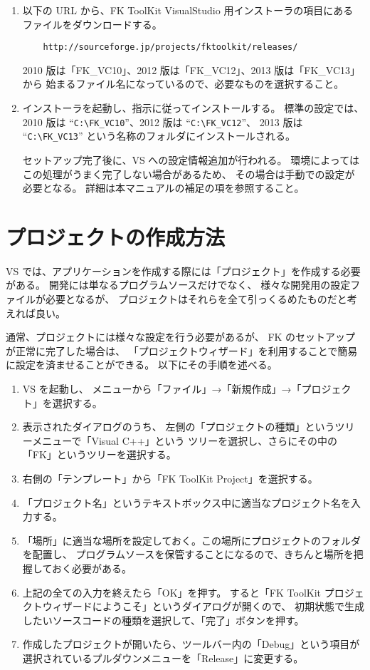 \documentclass[a4j]{jarticle}
\begin{document}
\begin{enumerate}
\item 以下の URL から、FK ToolKit VisualStudio 用インストーラの項目にある
ファイルをダウンロードする。

\begin{verbatim}
    http://sourceforge.jp/projects/fktoolkit/releases/
\end{verbatim}

2010 版は「FK\_VC10」、2012 版は「FK\_VC12」、2013 版は「FK\_VC13」から
始まるファイル名になっているので、必要なものを選択すること。

\item インストーラを起動し、指示に従ってインストールする。
標準の設定では、2010 版は ``\verb+C:\FK_VC10+''、2012 版は ``\verb+C:\FK_VC12+''、
2013 版は ``\verb+C:\FK_VC13+'' という名称のフォルダにインストールされる。

セットアップ完了後に、VS への設定情報追加が行われる。
環境によってはこの処理がうまく完了しない場合があるため、
その場合は手動での設定が必要となる。
詳細は本マニュアルの補足の項を参照すること。


\end{enumerate}

\section{プロジェクトの作成方法}
VS では、アプリケーションを作成する際には「プロジェクト」を作成する必要がある。
開発には単なるプログラムソースだけでなく、
様々な開発用の設定ファイルが必要となるが、
プロジェクトはそれらを全て引っくるめたものだと考えれば良い。

通常、プロジェクトには様々な設定を行う必要があるが、
FK のセットアップが正常に完了した場合は、
「プロジェクトウィザード」を利用することで簡易に設定を済ませることができる。
以下にその手順を述べる。

\begin{enumerate}
 \item VS を起動し、
	メニューから「ファイル」→「新規作成」→「プロジェクト」を選択する。
 \item 表示されたダイアログのうち、
	左側の「プロジェクトの種類」というツリーメニューで「Visual C++」という
	ツリーを選択し、さらにその中の「FK」というツリーを選択する。
 \item 右側の「テンプレート」から「FK ToolKit Project」を選択する。
 \item 「プロジェクト名」というテキストボックス中に適当なプロジェクト名を入力する。
 \item 「場所」に適当な場所を設定しておく。この場所にプロジェクトのフォルダを配置し、
	プログラムソースを保管することになるので、きちんと場所を把握しておく必要がある。
 \item 上記の全ての入力を終えたら「OK」を押す。
	すると「FK ToolKit プロジェクトウィザードにようこそ」というダイアログが開くので、
	初期状態で生成したいソースコードの種類を選択して、「完了」ボタンを押す。
 \item	作成したプロジェクトが開いたら、ツールバー内の「Debug」という項目が
 	選択されているプルダウンメニューを「Release」に変更する。
\end{enumerate}
\end{document}
